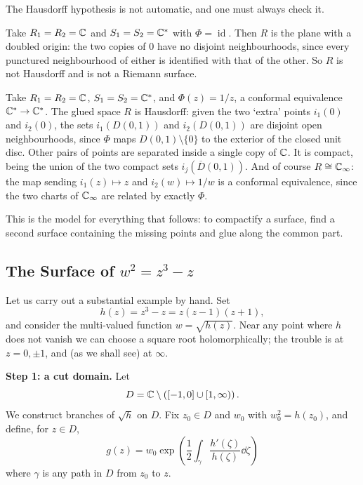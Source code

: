 \documentclass[a4paper]{scrartcl}
\newcommand{\id}{\operatorname{id}}
\newcommand{\Cinf}{\C_\infty}
\newcommand{\Cs}{\C^*}
\begin{document}
The Hausdorff hypothesis is not automatic, and one must always check it.

\begin{example}
	Take $R_1 = R_2 = \mathbb{C}$ and $S_1 = S_2 = \Cs$ with $\Phi = \id$. Then $R$ is the plane
	with a doubled origin: the two copies of $0$ have no disjoint neighbourhoods, since
	every punctured neighbourhood of either is identified with that of the other. So $R$ is
	not Hausdorff and is not a Riemann surface.
\end{example}

\begin{example}\label{ex:spheregluing}
	Take $R_1 = R_2 = \mathbb{C}$, $S_1 = S_2 = \Cs$, and $\Phi(z) = 1/z$, a conformal equivalence
	$\Cs \to \Cs$. The glued space $R$ is Hausdorff: given the two `extra' points
	$i_1(0)$ and $i_2(0)$, the sets $i_1(D(0,1))$ and $i_2(D(0,1))$ are disjoint open
	neighbourhoods, since $\Phi$ maps $D(0,1)\setminus\{0\}$ to the exterior of the closed
	unit disc. Other pairs of points are separated inside a single copy of $\mathbb{C}$. It is
	compact, being the union of the two compact sets $i_j(\overline{D}(0,1))$. And of course
	$R \cong \Cinf$: the map sending $i_1(z) \mapsto z$ and $i_2(w) \mapsto 1/w$ is a
	conformal equivalence, since the two charts of $\Cinf$ are related by exactly $\Phi$.
\end{example}

This is the model for everything that follows: to compactify a surface, find a second
surface containing the missing points and glue along the common part.

\subsection{The Surface of $w^2 = z^3 - z$}\label{subsec:cubicsurface}

Let us carry out a substantial example by hand. Set
$$
h(z) = z^3 - z = z(z-1)(z+1),
$$
and consider the multi-valued function $w = \sqrt{h(z)}$. Near any point where $h$ does
not vanish we can choose a square root holomorphically; the trouble is at $z = 0, \pm 1$,
and (as we shall see) at $\infty$.

\vspace{0.4em}
\textbf{Step 1: a cut domain.} Let
$$
D = \mathbb{C} \setminus \left( [-1, 0] \cup [1, \infty) \right).
$$
We construct branches of $\sqrt h$ on $D$. Fix $z_0 \in D$ and $w_0$ with $w_0^2 = h(z_0)$,
and define, for $z \in D$,
$$
g(z) = w_0 \exp\left( \frac{1}{2}\int_\gamma \frac{h'(\zeta)}{h(\zeta)} \dd\zeta \right)
$$
where $\gamma$ is any path in $D$ from $z_0$ to $z$.
\end{document}
